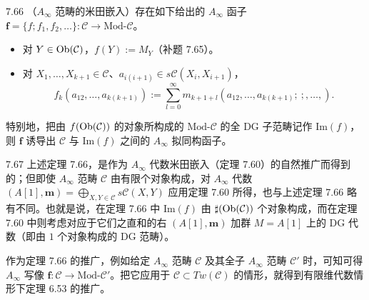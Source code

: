 \begin{theorem}{7.66}
（$A_\infty$ 范畴的米田嵌入）存在如下给出的 $A_\infty$ 函子 $\mathbf f=\{f;f_{1},f_{2},\dots\}\colon\mathcal C\to\mathrm{Mod}\text{-}\mathcal C$。
\begin{itemize}[leftmargin=1.6em,itemsep=2pt,topsep=2pt]
  \item 对 $Y\in\operatorname{Ob}(\mathcal C)$，$f(Y):=M_{Y}$（补题 7.65）。
  \item 对 $X_{1},\dots,X_{k+1}\in\mathcal C$、$a_{i(i+1)}\in s\mathcal C(X_{i},X_{i+1})$，
  \[
    f_{k}(a_{12},\dots,a_{k(k+1)}):=\sum_{l=0}^{\infty}m_{k+1+l}(a_{12},\dots,a_{k(k+1)};\ ;,\dots,).
  \]
\end{itemize}
特别地，把由 $f(\operatorname{Ob}(\mathcal C))$ 的对象所构成的 $\mathrm{Mod}\text{-}\mathcal C$ 的全 DG 子范畴记作 $\mathrm{Im}(f)$，则 $\mathbf f$ 诱导出 $\mathcal C$ 与 $\mathrm{Im}(f)$ 之间的 $A_\infty$ 拟同构函子。
\end{theorem}


\begin{remark}{7.67}
上述定理 7.66，是作为 $A_\infty$ 代数米田嵌入（定理 7.60）的自然推广而得到的；但即使 $A_\infty$ 范畴 $\mathcal C$ 由有限个对象构成，对 $A_\infty$ 代数 $(A[1],\mathbf m)=\bigoplus_{X,Y\in\mathcal C}s\mathcal C(X,Y)$ 应用定理 7.60 所得，也与上述定理 7.66 略有不同。也就是说，在定理 7.66 中 $\mathrm{Im}(f)$ 由 $\sharp(\operatorname{Ob}(\mathcal C))$ 个对象构成，而在定理 7.60 中则考虑对应于它们之直和的右 $(A[1],\mathbf m)$ 加群 $M=A[1]$ 上的 DG 代数（即由 $1$ 个对象构成的 DG 范畴）。
\end{remark}

作为定理 7.66 的推广，例如给定 $A_\infty$ 范畴 $\mathcal C$ 及其全子 $A_\infty$ 范畴 $\mathcal C'$ 时，可知可得 $A_\infty$ 写像 $\mathbf f\colon\mathcal C\to\mathrm{Mod}\text{-}\mathcal C'$。把它应用于 $\mathcal C\subset Tw(\mathcal C)$ 的情形，就得到有限维代数情形下定理 6.53 的推广。

